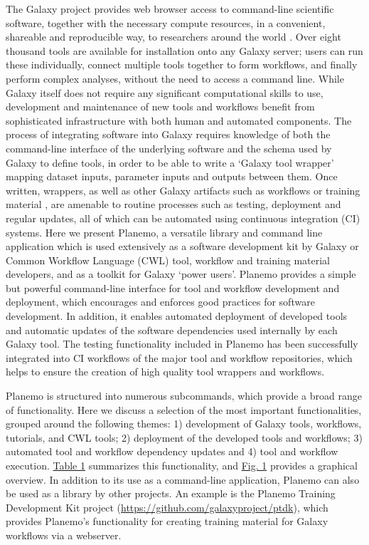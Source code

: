 The Galaxy project provides web browser access to command-line
scientific software, together with the necessary compute resources, in a
convenient, shareable and reproducible way, to researchers around the
world \cite{Afgan_2018}. Over eight thousand tools are available for installation
onto any Galaxy server; users can run these individually, connect
multiple tools together to form workflows, and finally perform complex
analyses, without the need to access a command line. While Galaxy itself
does not require any significant computational skills to use,
development and maintenance of new tools and workflows benefit from
sophisticated infrastructure with both human and automated components.
The process of integrating software into Galaxy requires knowledge of
both the command-line interface of the underlying software and the
schema used by Galaxy to define tools, in order to be able to write a
`Galaxy tool wrapper' mapping dataset inputs, parameter inputs and
outputs between them. Once written, wrappers, as well as other Galaxy
artifacts such as workflows or training material \cite{Batut_2018}, are amenable
to routine processes such as testing, deployment and regular updates,
all of which can be automated using continuous integration (CI) systems.
Here we present Planemo, a versatile library and command line
application which is used extensively as a software development kit by
Galaxy or Common Workflow Language (CWL) \cite{Crusoe_2022} tool, workflow and
training material developers, and as a toolkit for Galaxy `power users'.
Planemo provides a simple but powerful command-line interface for tool
and workflow development and deployment, which encourages and enforces
good practices for software development. In addition, it enables
automated deployment of developed tools and automatic updates of the
software dependencies used internally by each Galaxy tool. The testing
functionality included in Planemo has been successfully integrated into
CI workflows of the major tool and workflow repositories, which helps to
ensure the creation of high quality tool wrappers and workflows.

Planemo is structured into numerous subcommands, which provide a broad
range of functionality. Here we discuss a selection of the most
important functionalities, grouped around the following themes: 1)
development of Galaxy tools, workflows, tutorials, and CWL tools; 2)
deployment of the developed tools and workflows; 3) automated tool and
workflow dependency updates and 4) tool and workflow execution.
\protect\hypertarget{xref-table-wrap-1-1}{\protect\hyperlink{tbl1}{Table
1}} summarizes this functionality, and
\protect\hypertarget{xref-fig-1-1}{\protect\hyperlink{fig1}{Fig. 1}}
provides a graphical overview. In addition to its use as a command-line
application, Planemo can also be used as a library by other projects. An
example is the Planemo Training Development Kit project
(\protect\hypertarget{ext-link-4}{\url{https://github.com/galaxyproject/ptdk}}),
which provides Planemo's functionality for creating training material
for Galaxy workflows via a webserver.


